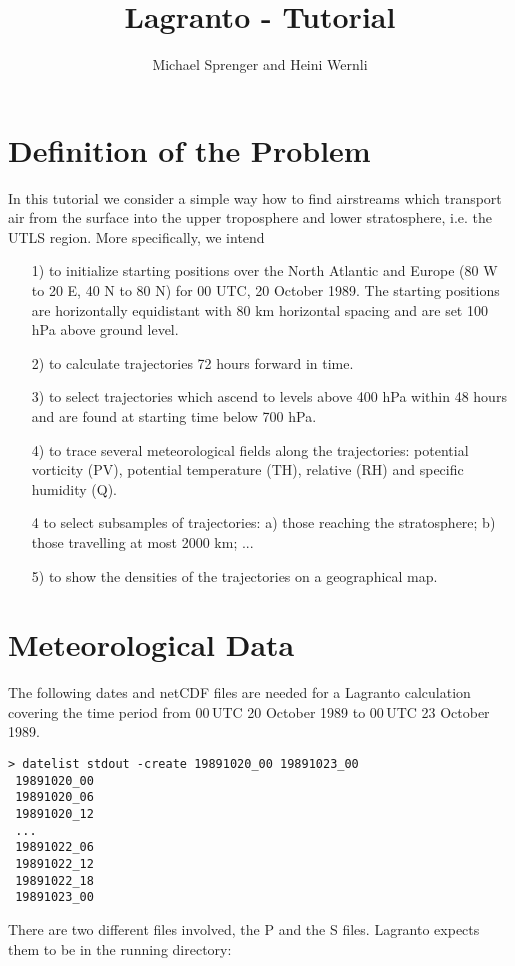 \documentclass[a4paper,10pt]{article}
\title{Lagranto - Tutorial}
\author{Michael Sprenger and Heini Wernli}
\begin{document}
\maketitle

\section{Definition of the Problem}

In this tutorial we consider a simple way how to find airstreams which transport air from the surface into the upper troposphere and lower stratosphere, i.e. the UTLS region. More specifically, we intend
\begin{itemize}
\item[1)] to initialize starting positions over the North Atlantic and Europe (80 W to 20 E, 40 N to 80 N) for 00 UTC, 20 October 1989. The starting positions are horizontally equidistant with 80 km horizontal spacing and are set 100 hPa above ground level.
\item[2)] to calculate trajectories 72 hours forward in time.
\item[3)] to select trajectories which ascend to levels above 400 hPa within 48 hours and are found at starting time below 700 hPa.
\item[4)] to trace several meteorological fields along the trajectories: potential vorticity (PV), potential temperature (TH), relative (RH) and specific humidity (Q).
\item[4] to select subsamples of trajectories: a) those reaching the stratosphere; b) those travelling at most 2000 km; ... 
\item[5)] to show the densities of the trajectories on a geographical map.
\end{itemize}

\section{Meteorological Data}

The following dates and netCDF files are needed for a Lagranto calculation covering the time period from 00\,UTC 20 October 1989 to 00\,UTC 23 October 1989. 
\begin{verbatim}
> datelist stdout -create 19891020_00 19891023_00
 19891020_00
 19891020_06
 19891020_12
 ...
 19891022_06
 19891022_12
 19891022_18
 19891023_00
\end{verbatim}

\noindent
There are two different files involved, the P and the S files. Lagranto expects them to be in the running directory:
\end{document}
